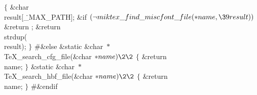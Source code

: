 ${}\{{}$\1\6
\&{char} \\{result}[\.{\_MAX\_PATH}];\7
\&{if} ${}(\R\\{miktex\_find\_miscfont\_file}({*}\\{name},\39\\{result})){}$\1\5
\&{return} ;\2\6
\&{return} \\{strdup}(\\{result});\6
\4${}\}{}$\2\7
\8\#\&{else}\7
\1\1\&{static} \&{char} ${}{*}{}$\\{TeX\_search\_cfg\_file}(\&{char} ${}{*}%
\\{name})\2\2{}$\6
${}\{{}$\1\6
\&{return} \\{name};\6
\4${}\}{}$\2\7
\1\1\&{static} \&{char} ${}{*}{}$\\{TeX\_search\_hbf\_file}(\&{char} ${}{*}%
\\{name})\2\2{}$\6
${}\{{}$\1\6
\&{return} \\{name};\6
\4${}\}{}$\2\6
\8\#\&{endif}\par
\fi

